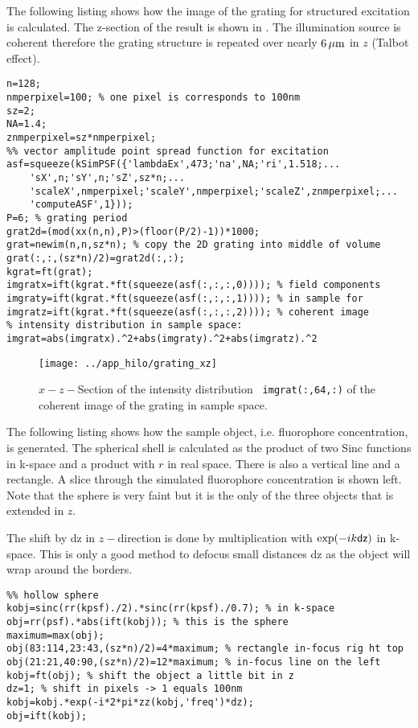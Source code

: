 The following listing shows how the image of the grating for
structured excitation is calculated. The z-section of the result is
shown in . The illumination source is coherent
therefore the grating structure is repeated over nearly $\unit[6]{\mu
  m}$ in $z$ (Talbot effect).
\begin{lstlisting}
n=128;
nmperpixel=100; % one pixel is corresponds to 100nm
sz=2;
NA=1.4;
znmperpixel=sz*nmperpixel;
%% vector amplitude point spread function for excitation
asf=squeeze(kSimPSF({'lambdaEx',473;'na',NA;'ri',1.518;...
    'sX',n;'sY',n;'sZ',sz*n;...
    'scaleX',nmperpixel;'scaleY',nmperpixel;'scaleZ',znmperpixel;...
    'computeASF',1}));
P=6; % grating period
grat2d=(mod(xx(n,n),P)>(floor(P/2)-1))*1000;
grat=newim(n,n,sz*n); % copy the 2D grating into middle of volume
grat(:,:,(sz*n)/2)=grat2d(:,:);
kgrat=ft(grat);
imgratx=ift(kgrat.*ft(squeeze(asf(:,:,:,0)))); % field components
imgraty=ift(kgrat.*ft(squeeze(asf(:,:,:,1)))); % in sample for
imgratz=ift(kgrat.*ft(squeeze(asf(:,:,:,2)))); % coherent image
% intensity distribution in sample space:
imgrat=abs(imgratx).^2+abs(imgraty).^2+abs(imgratz).^2
\end{lstlisting}
\begin{figure}[htb]
  \centering
  \texttt{[image: ../app\_hilo/grating\_xz]}
  \caption{$x-z-$Section of the intensity distribution {\tt
      imgrat(:,64,:)} of the coherent image of the grating in sample
    space.}
  \label{fig:grating}
\end{figure}
The following listing shows how the sample object, i.e. fluorophore
concentration, is generated.  The spherical shell is calculated as the
product of two Sinc functions in k-space and a product with $r$ in
real space. There is also a vertical line and a rectangle. A slice
through the simulated fluorophore concentration is shown
 left. Note that the sphere is very faint but it is
the only of the three objects that is extended in $z$.

The shift by {\sf dz} in $z-$direction is done by multiplication with
$\exp(-ik{\sf dz})$ in k-space. This is only a good method to defocus
small distances {\sf dz} as the object will wrap around the borders.

\begin{lstlisting}
%% hollow sphere
kobj=sinc(rr(kpsf)./2).*sinc(rr(kpsf)./0.7); % in k-space
obj=rr(psf).*abs(ift(kobj)); % this is the sphere
maximum=max(obj);
obj(83:114,23:43,(sz*n)/2)=4*maximum; % rectangle in-focus rig ht top
obj(21:21,40:90,(sz*n)/2)=12*maximum; % in-focus line on the left
kobj=ft(obj); % shift the object a little bit in z
dz=1; % shift in pixels -> 1 equals 100nm
kobj=kobj.*exp(-i*2*pi*zz(kobj,'freq')*dz);
obj=ift(kobj);
\end{lstlisting}


